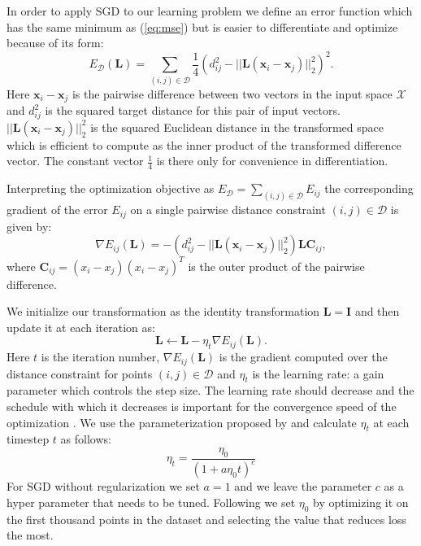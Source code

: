 \documentclass[a4paper,titlepage]{article}
\renewcommand{\vec}[1]{\mathbf{#1}}
\newcommand{\mat}[1]{\mathbf{#1}}
\begin{document}
In order to apply \ac{SGD} to our learning problem we define an error function which has the same minimum as (\ref{eq:mse}) but is easier to differentiate and optimize because of its form:
\begin{equation}
E_{\mathcal{D}}(\mat{L}) =  \sum_{(i,j) \in \mathcal{D}}  \frac{1}{4} \left ( d_{ij}^2 - ||\mat{L}(\vec{x}_i - \vec{x}_j)||_2^2 \right )^2.
\label{eq:opt_target}
\end{equation}
Here $\vec{x}_i - \vec{x}_j$ is the pairwise difference between two vectors in the input space $\mathcal{X}$ and $d_{ij}^2$ is the squared target distance for this pair of input vectors. $||\mat{L}(\vec{x}_i - \vec{x}_j)||_2^2$ is the squared Euclidean distance in the transformed space which is efficient to compute as the inner product of the transformed difference vector. The constant vector $\frac{1}{4}$ is there only for convenience in differentiation. 

Interpreting the optimization objective as $E_{\mathcal{D}} = \sum_{(i,j)\in\mathcal{D}} E_{ij}$ the corresponding gradient of the error $E_{ij}$ on a single pairwise distance constraint $(i,j) \in \mathcal{D}$ is given by:
\begin{equation}
\nabla E_{ij}(\mat{L})  = - \left ( d_{ij}^2 - ||\mat{L}(\vec{x}_i - \vec{x}_j)||_2^2 \right) \mat{L} \mat{C}_{ij},
\label{eq:opt_grad}
\end{equation}
where $\mat{C}_{ij} = (x_i - x_j)(x_i - x_j)^T$ is the outer product of the pairwise difference.

We initialize our transformation as the identity transformation $\mat{L} = \mat{I}$ and then update it at each iteration as:
\begin{equation}
\mat{L} \leftarrow \mat{L} - \eta_{t} \nabla E_{ij}(\mat{L}).
\label{eq:update}
\end{equation}
Here $t$ is the iteration number, $\nabla E_{ij}(\mat{L})$ is the gradient computed over the distance constraint for points $(i,j) \in \mathcal{D}$ and $\eta_{t}$ is the learning rate: a gain parameter which controls the step size. The learning rate should decrease and the schedule with which it decreases is important for the convergence speed of the optimization \cite{xu2011towards}. We use the parameterization proposed by \cite{xu2011towards} and calculate $\eta_{t}$ at each timestep $t$ as follows:
\begin{equation}
\eta_{t} = \frac{\eta_0}{\left(1+ a \eta_0 t \right)^c}
\label{eq:eta_update}
\end{equation}
For SGD without regularization we set $a = 1$ and we leave the parameter $c$ as a hyper parameter that needs to be tuned. Following \cite{bottou2008tradeoffs} we set $\eta_0$ by optimizing it on the first thousand points in the dataset and selecting the value that reduces loss the most.
\end{document}
